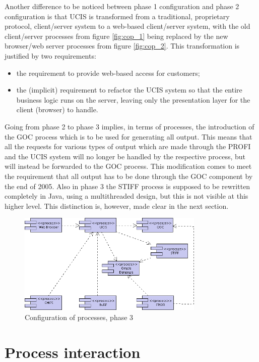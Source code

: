 Another difference to be noticed between phase 1 configuration and phase 2 configuration is
that UCIS is transformed from a traditional, proprietary protocol, client/server system to a
web-based client/server system, with the old client/server processes from figure \ref{fig:cop_1}
being replaced by the new browser/web server processes from figure \ref{fig:cop_2}. This
transformation is justified by two requirements:
\begin{itemize}
\item{the requirement to provide web-based access for customers;}
\item{the (implicit) requirement to refactor the UCIS system so that the entire business logic
runs on the server, leaving only the presentation layer for the client (browser) to handle.}
\end{itemize}

Going from phase 2 to phase 3 implies, in terms of processes, the introduction of the GOC process
which is to be used for generating all output. This means that all the requests for various types
of output which are made through the PROFI and the UCIS system will no longer be handled by
the respective process, but will instead be forwarded to the GOC process. This modification comes
to meet the requirement that all output has to be done through the GOC component by the
end of 2005. Also in phase 3 the STIFF process is supposed to be rewritten completely in Java,
using a multithreaded design, but this is not visible at this higher level. This distinction is, however,
made clear in the next section.

\begin{figure}[ht]
\begin{center}
\includegraphics[width=3.5in]{img/cop_3.png}
\end{center}
\caption{Configuration of processes, phase 3}
\label{fig:cop_3}
\end{figure}

\section{Process interaction}

